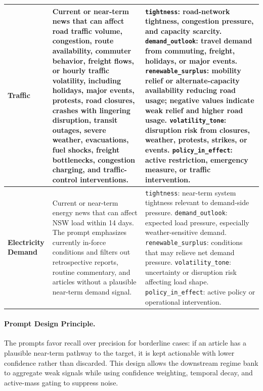 \documentclass{article}
\begin{document}
\begin{table}[h]
{\begin{tabular}{p{} p{} p{}}
\midrule

\textbf{Traffic}
&
Current or near-term news that can affect road traffic volume, congestion, route availability, commuter behavior, freight flows, or hourly traffic volatility, including holidays, major events, protests, road closures, crashes with lingering disruption, transit outages, severe weather, evacuations, fuel shocks, freight bottlenecks, congestion charging, and traffic-control interventions.
&
\texttt{tightness}: road-network tightness, congestion pressure, and capacity scarcity.
\newline
\texttt{demand\_outlook}: travel demand from commuting, freight, holidays, or major events.
\newline
\texttt{renewable\_surplus}: mobility relief or alternate-capacity availability reducing road usage; negative values indicate weak relief and higher road usage.
\newline
\texttt{volatility\_tone}: disruption risk from closures, weather, protests, strikes, or events.
\newline
\texttt{policy\_in\_effect}: active restriction, emergency measure, or traffic intervention.
\\

\midrule

\textbf{Electricity Demand}
&
Current or near-term energy news that can affect NSW load within 14 days. The prompt emphasizes currently in-force conditions and filters out retrospective reports, routine commentary, and articles without a plausible near-term demand signal.
&
\texttt{tightness}: near-term system tightness relevant to demand-side pressure.
\newline
\texttt{demand\_outlook}: expected load pressure, especially weather-sensitive demand.
\newline
\texttt{renewable\_surplus}: conditions that may relieve net demand pressure.
\newline
\texttt{volatility\_tone}: uncertainty or disruption risk affecting load shape.
\newline
\texttt{policy\_in\_effect}: active policy or operational intervention.
\\

\bottomrule
\end{tabular}%
}
\end{table}

\paragraph{Prompt Design Principle.}
The prompts favor recall over precision for borderline cases: if an article has a plausible near-term pathway to the target, it is kept actionable with lower confidence rather than discarded. This design allows the downstream regime bank to aggregate weak signals while using confidence weighting, temporal decay, and active-mass gating to suppress noise.
\end{document}
